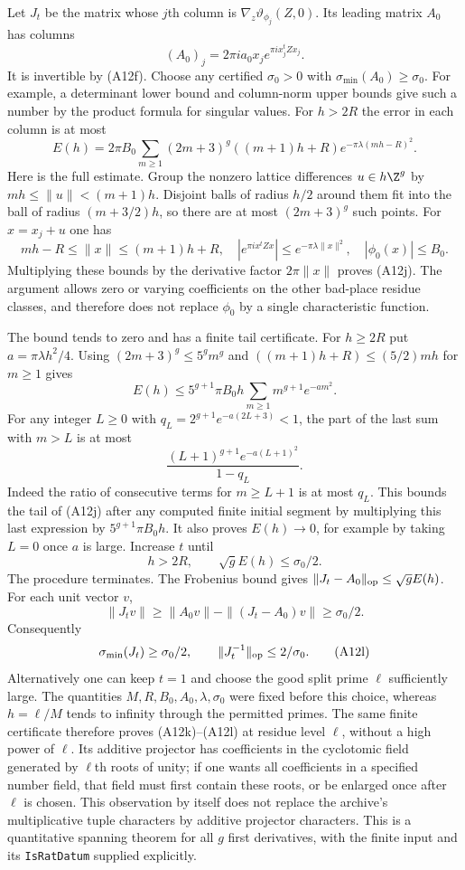 Let $J_t$ be the matrix whose $j$th column is
$\nabla_z\vartheta_{\phi_j}(Z,0)$.  Its leading matrix
$A_0$ has columns
\[
         (A_0)_j=2\pi i a_0x_j e^{\pi i x_j^tZx_j}.
 \tag{A12i}
\]
It is invertible by (A12f).  Choose any certified
$\sigma_0>0$ with $\sigma_{\min}(A_0)\geq\sigma_0$.
For example, a determinant lower bound and column-norm
upper bounds give such a number by the product formula
for singular values.  For $h>2R$ the error in each column
is at most
\[
 E(h)=2\pi B_0\sum_{m\geq1}(2m+3)^g
        ((m+1)h+R)e^{-\pi\lambda(mh-R)^2}.
 \tag{A12j}
\]
Here is the full estimate.  Group the nonzero lattice
differences $u\in h\Z^g$ by
$mh\leq\|u\|<(m+1)h$.  Disjoint balls of radius
$h/2$ around them fit into the ball of radius
$(m+3/2)h$, so there are at most $(2m+3)^g$ such
points.  For $x=x_j+u$ one has
\[
 mh-R\leq\|x\|\leq(m+1)h+R,
 \quad |e^{\pi ix^tZx}|\leq e^{-\pi\lambda\|x\|^2},
 \quad |\phi_0(x)|\leq B_0.
\]
Multiplying these bounds by the derivative factor
$2\pi\|x\|$ proves (A12j).  The argument allows zero
or varying coefficients on the other bad-place residue
classes, and therefore does not replace $\phi_0$ by
a single characteristic function.

The bound tends to zero and has a finite tail certificate.
For $h\geq2R$ put $a=\pi\lambda h^2/4$.  Using
$(2m+3)^g\leq5^gm^g$ and
$((m+1)h+R)\leq(5/2)mh$ for $m\geq1$ gives
\[
 E(h)\leq5^{g+1}\pi B_0h
                   \sum_{m\geq1}m^{g+1}e^{-am^2}.
\]
For any integer $L\geq0$ with
$q_L=2^{g+1}e^{-a(2L+3)}<1$, the part of the last
sum with $m>L$ is at most
\[
          \frac{(L+1)^{g+1}e^{-a(L+1)^2}}{1-q_L}.
\]
Indeed the ratio of consecutive terms for $m\geq L+1$
is at most $q_L$.  This bounds the tail of (A12j)
after any computed finite initial segment by multiplying
this last expression by $5^{g+1}\pi B_0h$.
It also proves $E(h)\longrightarrow0$, for example by
taking $L=0$ once $a$ is large.  Increase $t$ until
\[
                  h>2R,\qquad
                  \sqrt g E(h)\leq\sigma_0/2.
 \tag{A12k}
\]
The procedure terminates.  The Frobenius bound gives
$\|J_t-A_0\|_{\rm op}\leq\sqrt g E(h)$.
For each unit vector $v$,
\[
 \|J_tv\|\geq\|A_0v\|-\|(J_t-A_0)v\|
                       \geq\sigma_0/2.
\]
Consequently
\[
       \sigma_{\min}(J_t)\geq\sigma_0/2,
                   \qquad \|J_t^{-1}\|_{\rm op}\leq2/\sigma_0.
 \tag{A12l}
\]
Alternatively one can keep $t=1$ and choose the good
split prime $\ell$ sufficiently large.  The quantities
$M,R,B_0,A_0,\lambda,\sigma_0$ were fixed before this
choice, whereas $h=\ell/M$ tends to infinity through
the permitted primes.  The same finite certificate
therefore proves (A12k)--(A12l) at residue level
$\ell$, without a high power of $\ell$.  Its additive
projector has coefficients in the cyclotomic field
generated by $\ell$th roots of unity; if one wants
all coefficients in a specified number field, that
field must first contain these roots, or be enlarged
once after $\ell$ is chosen.  This observation by
itself does not replace the archive's multiplicative
tuple characters by additive projector characters.
This is a quantitative spanning theorem for all $g$
first derivatives, with the finite input and its
\texttt{IsRatDatum} supplied explicitly.

